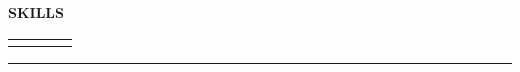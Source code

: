 \begin{center}
\textbf{SKILLS}
\end{center}

\vspace{0.3cm}

\begin{center}
\begin{tabular}{p{}p{}p{}p{}}
 &  &  & 
\end{tabular}
\end{center}

\vspace{0.5cm}
\rule{\textwidth}{0.5pt}
\vspace{0.5cm} 
